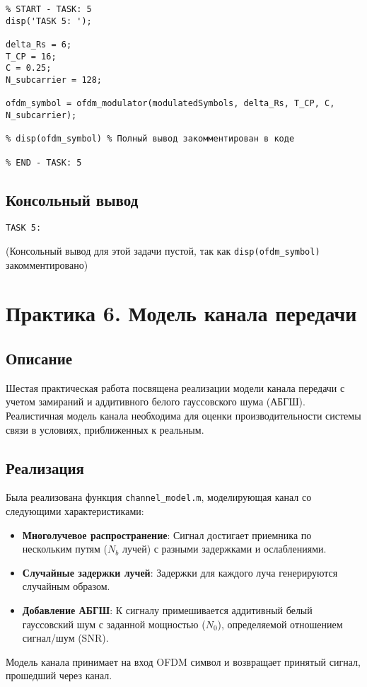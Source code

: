 \begin{verbatim}
% START - TASK: 5
disp('TASK 5: ');

delta_Rs = 6;
T_CP = 16;
C = 0.25;
N_subcarrier = 128;

ofdm_symbol = ofdm_modulator(modulatedSymbols, delta_Rs, T_CP, C, N_subcarrier);

% disp(ofdm_symbol) % Полный вывод закомментирован в коде

% END - TASK: 5
\end{verbatim}

\subsection{Консольный вывод}
\begin{verbatim}
TASK 5:
\end{verbatim}
(Консольный вывод для этой задачи пустой, так как \texttt{disp(ofdm\_symbol)} закомментировано)

\section{Практика 6. Модель канала передачи}

\subsection{Описание}
Шестая практическая работа посвящена реализации модели канала передачи с учетом замираний и аддитивного белого гауссовского шума (АБГШ). Реалистичная модель канала необходима для оценки производительности системы связи в условиях, приближенных к реальным.

\subsection{Реализация}
Была реализована функция \texttt{channel\_model.m}, моделирующая канал со следующими характеристиками:
\begin{itemize}
    \item \textbf{Многолучевое распространение}: Сигнал достигает приемника по нескольким путям ($N_b$ лучей) с разными задержками и ослаблениями.
    \item \textbf{Случайные задержки лучей}: Задержки для каждого луча генерируются случайным образом.
    \item \textbf{Добавление АБГШ}: К сигналу примешивается аддитивный белый гауссовский шум с заданной мощностью ($N_0$), определяемой отношением сигнал/шум (SNR).
\end{itemize}
Модель канала принимает на вход OFDM символ и возвращает принятый сигнал, прошедший через канал.

